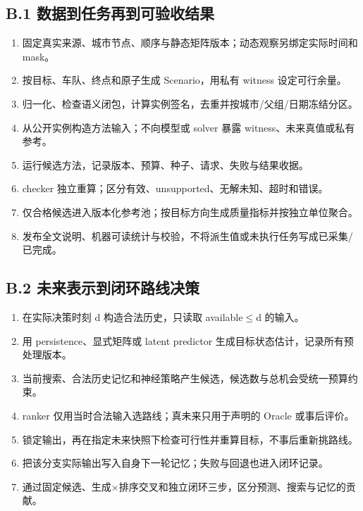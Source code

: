 \documentclass[UTF8,10pt,a4paper,fontset=fandol]{ctexart}
\begin{document}
\subsection*{B.1 数据到任务再到可验收结果}

\begin{enumerate}

\item 固定真实来源、城市节点、顺序与静态矩阵版本；动态观察另绑定实际时间和 mask。

\item 按目标、车队、终点和原子生成 Scenario，用私有 witness 设定可行余量。

\item 归一化、检查语义闭包，计算实例签名，去重并按城市/\allowbreak{}父组/\allowbreak{}日期冻结分区。

\item 从公开实例构造方法输入；不向模型或 solver 暴露 witness、未来真值或私有参考。

\item 运行候选方法，记录版本、预算、种子、请求、失败与结果收据。

\item checker 独立重算；区分有效、unsupported、无解未知、超时和错误。

\item 仅合格候选进入版本化参考池；按目标方向生成质量指标并按独立单位聚合。

\item 发布全文说明、机器可读统计与校验，不将派生值或未执行任务写成已采集/\allowbreak{}已完成。

\end{enumerate}

\subsection*{B.2 未来表示到闭环路线决策}

\begin{enumerate}

\item 在实际决策时刻 d 构造合法历史，只读取 available\ensuremath{\le}d 的输入。

\item 用 persistence、显式矩阵或 latent predictor 生成目标状态估计，记录所有预处理版本。

\item 当前搜索、合法历史记忆和神经策略产生候选，候选数与总机会受统一预算约束。

\item ranker 仅用当时合法输入选路线；真未来只用于声明的 Oracle 或事后评价。

\item 锁定输出，再在指定未来快照下检查可行性并重算目标，不事后重新挑路线。

\item 把该分支实际输出写入自身下一轮记忆；失败与回退也进入闭环记录。

\item 通过固定候选、生成\ensuremath{\times}排序交叉和独立闭环三步，区分预测、搜索与记忆的贡献。

\end{enumerate}\endgroup
\end{document}
